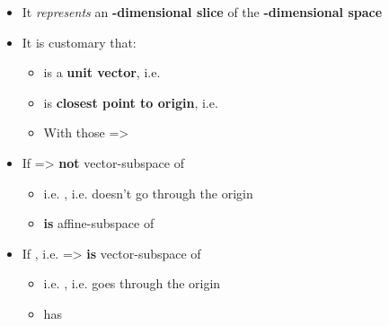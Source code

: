 \begin{itemize}

      \item
            It \emph{represents} an \textbf{-dimensional slice} of
            the \textbf{-dimensional space}
      \item
            It is customary that:

            \begin{itemize}

                  \item
                         is a \textbf{unit vector},
                        i.e. 
                  \item
                         is \textbf{closest point to origin},
                        i.e. 
                  \item
                        With those =>
            \end{itemize}
      \item
            If 
            =>  \textbf{not} vector-subspace of 

            \begin{itemize}

                  \item
                        i.e. , i.e.  doesn't go through the origin
                  \item
                         \textbf{is} affine-subspace of 
            \end{itemize}
      \item
            If , i.e.  =>
             \textbf{is} vector-subspace of 

            \begin{itemize}

                  \item
                        i.e. , i.e.  goes through the origin
                  \item
                         has 
            \end{itemize}
\end{itemize}

